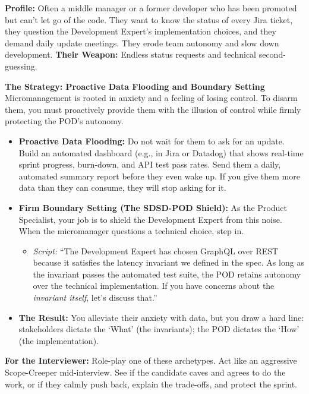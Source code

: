 \documentclass[
  11pt,
  openany,
  oneside]{book}
\providecommand{\tightlist}{%
  \setlength{\itemsep}{0pt}\setlength{\parskip}{0pt}}
\renewenvironment{quote}{\begin{customquote}}{\end{customquote}}
\begin{document}
\textbf{Profile:} Often a middle manager or a former developer who has
been promoted but can't let go of the code. They want to know the status
of every Jira ticket, they question the Development Expert's
implementation choices, and they demand daily update meetings. They
erode team autonomy and slow down development. \textbf{Their Weapon:}
Endless status requests and technical second-guessing.

\textbf{The Strategy: Proactive Data Flooding and Boundary Setting}
Micromanagement is rooted in anxiety and a feeling of losing control. To
disarm them, you must proactively provide them with the illusion of
control while firmly protecting the POD's autonomy.

\begin{itemize}
\tightlist
\item
  \textbf{Proactive Data Flooding:} Do not wait for them to ask for an
  update. Build an automated dashboard (e.g., in Jira or Datadog) that
  shows real-time sprint progress, burn-down, and API test pass rates.
  Send them a daily, automated summary report before they even wake up.
  If you give them more data than they can consume, they will stop
  asking for it.
\item
  \textbf{Firm Boundary Setting (The SDSD-POD Shield):} As the Product
  Specialist, your job is to shield the Development Expert from this
  noise. When the micromanager questions a technical choice, step in.

  \begin{itemize}
  \tightlist
  \item
    \emph{Script:} ``The Development Expert has chosen GraphQL over REST
    because it satisfies the latency invariant we defined in the spec.
    As long as the invariant passes the automated test suite, the POD
    retains autonomy over the technical implementation. If you have
    concerns about the \emph{invariant itself}, let's discuss that.''
  \end{itemize}
\item
  \textbf{The Result:} You alleviate their anxiety with data, but you
  draw a hard line: stakeholders dictate the `What' (the invariants);
  the POD dictates the `How' (the implementation).
\end{itemize}

\begin{quote}
\textbf{For the Interviewer:} Role-play one of these archetypes. Act
like an aggressive Scope-Creeper mid-interview. See if the candidate
caves and agrees to do the work, or if they calmly push back, explain
the trade-offs, and protect the sprint.
\end{quote}
\end{document}
